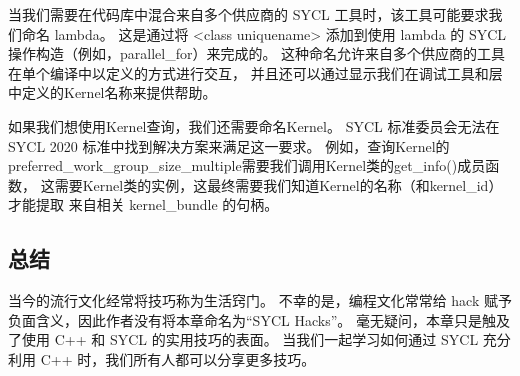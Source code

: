 当我们需要在代码库中混合来自多个供应商的 SYCL 工具时，该工具可能要求我们命名 lambda。 
这是通过将 <class uniquename> 添加到使用 lambda 的 SYCL 操作构造（例如，parallel\_for）来完成的。 
这种命名允许来自多个供应商的工具在单个编译中以定义的方式进行交互，
并且还可以通过显示我们在调试工具和层中定义的Kernel名称来提供帮助。

如果我们想使用Kernel查询，我们还需要命名Kernel。 
SYCL 标准委员会无法在 SYCL 2020 标准中找到解决方案来满足这一要求。 
例如，查询Kernel的preferred\_work\_group\_size\_multiple需要我们调用Kernel类的get\_info()成员函数，
这需要Kernel类的实例，这最终需要我们知道Kernel的名称（和kernel\_id）才能提取 来自相关 kernel\_bundle 的句柄。

\subsection{总结}
当今的流行文化经常将技巧称为生活窍门。 
不幸的是，编程文化常常给 hack 赋予负面含义，因此作者没有将本章命名为“SYCL Hacks”。 
毫无疑问，本章只是触及了使用 C++ 和 SYCL 的实用技巧的表面。 
当我们一起学习如何通过 SYCL 充分利用 C++ 时，我们所有人都可以分享更多技巧。